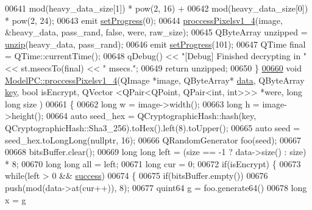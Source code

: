 \begin{DoxyCode}
00641             mod(heavy\_data\_size[1]) * pow(2, 16) +
00642             mod(heavy\_data\_size[0]) * pow(2, 24);
00643     emit \hyperlink{class_model_p_c_afdcd80f0ed5062e145a71f09b0897547}{setProgress}(0);
00644     \hyperlink{class_model_p_c_a5cdb4d1d61ff62ee9d45b496a7dbf1fb}{proccessPixelsv1\_4}(image, &heavy\_data, pass\_rand, \textcolor{keyword}{false}, were, raw\_size);
00645     QByteArray unzipped = \hyperlink{class_model_p_c_a6da88f166785a49f73b22c169f956fd0}{unzip}(heavy\_data, pass\_rand);
00646     emit \hyperlink{class_model_p_c_afdcd80f0ed5062e145a71f09b0897547}{setProgress}(101);
00647     QTime \textcolor{keyword}{final} = QTime::currentTime();
00648     qDebug() << \textcolor{stringliteral}{"[Debug] Finished decrypting in "} << st.msecsTo(\textcolor{keyword}{final}) << \textcolor{stringliteral}{" msecs."};
00649     \textcolor{keywordflow}{return} unzipped;
00650 \}
\hypertarget{modelpc_8cpp_source.tex_l00660}{}\hyperlink{class_model_p_c_a5cdb4d1d61ff62ee9d45b496a7dbf1fb}{00660} \textcolor{keywordtype}{void} \hyperlink{class_model_p_c_a5cdb4d1d61ff62ee9d45b496a7dbf1fb}{ModelPC::proccessPixelsv1\_4}(QImage *image, QByteArray* 
      \hyperlink{namespace_errors_dict_setup_af570460846fb9f0c91abd308a095dcdc}{data}, QByteArray \hyperlink{namespace_errors_dict_setup_a09c268098d09ffb8e5504f30fa6d5dd9}{key}, \textcolor{keywordtype}{bool} isEncrypt, QVector <QPair<QPoint, QPair<int, int>>> *were, \textcolor{keywordtype}{long} \textcolor{keywordtype}{long} size
      )
00661 \{
00662     \textcolor{keywordtype}{long} w = image->width();
00663     \textcolor{keywordtype}{long} h = image->height();
00664     \textcolor{keyword}{auto} seed\_hex = QCryptographicHash::hash(key, QCryptographicHash::Sha3\_256).toHex().left(8).toUpper();
00665     \textcolor{keyword}{auto} seed = seed\_hex.toLongLong(\textcolor{keyword}{nullptr}, 16);
00666     QRandomGenerator foo(seed);
00667 
00668     bitsBuffer.clear();
00669     \textcolor{keywordtype}{long} \textcolor{keywordtype}{long} left = (size == -1 ? data->size() : size) * 8;
00670     \textcolor{keywordtype}{long} \textcolor{keywordtype}{long} all = left;
00671     \textcolor{keywordtype}{long} cur = 0;
00672     \textcolor{keywordflow}{if}(isEncrypt) \{
00673         \textcolor{keywordflow}{while}(left > 0 && \hyperlink{class_model_p_c_a945ffbbc44a832b953c191debd448f4c}{success})
00674         \{
00675             \textcolor{keywordflow}{if}(bitsBuffer.empty())
00676                 push(mod(data->at(cur++)), 8);
00677             quint64 g = foo.generate64() %
00678             \textcolor{keywordtype}{long} x = g %

\end{DoxyCode}
